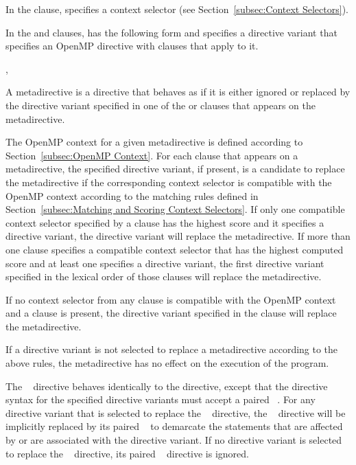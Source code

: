 In the  clause,  specifies a context
selector (see Section~\ref{subsec:Context Selectors}).


In the  and  clauses, 
has the following form and specifies a directive variant that specifies an OpenMP
directive with clauses that apply to it.

\begin{indentedcodelist}
\plc{ directive-name [clause[ [},\plc{] clause] ... ]}
\end{indentedcodelist}

\descr

A metadirective is a directive that behaves as if it is either ignored or
replaced by the directive variant specified in one of the  or
 clauses that appears on the metadirective.

The OpenMP context for a given metadirective is defined according to
Section~\ref{subsec:OpenMP Context}.  For each  clause that appears
on a metadirective, the specified directive variant, if present, is a candidate
to replace the metadirective if the corresponding context selector is compatible
with the OpenMP context according to the matching rules defined in
Section~\ref{subsec:Matching and Scoring Context Selectors}.  If only one
compatible context selector specified by a  clause has the highest
score and it specifies a directive variant, the directive variant will replace
the metadirective. If more than one  clause specifies a compatible
context selector that has the highest computed score and at least one specifies
a directive variant, the first directive variant specified in the lexical order
of those  clauses will replace the metadirective.

If no context selector from any  clause is compatible with the
OpenMP context and a  clause is present, the directive variant
specified in the  clause will replace the metadirective.

If a directive variant is not selected to replace a metadirective according
to the above rules, the metadirective has no effect on the execution of the
program.

The ~ directive behaves identically to the
 directive, except that the directive syntax for the
specified directive variants must accept a paired ~.
For any directive variant that is selected to replace the
~ directive, the
~ directive will be implicitly replaced by its
paired ~ to demarcate the statements that are
affected by or are associated with the directive variant. If no directive
variant is selected to replace the ~
directive, its paired ~ directive is ignored.

